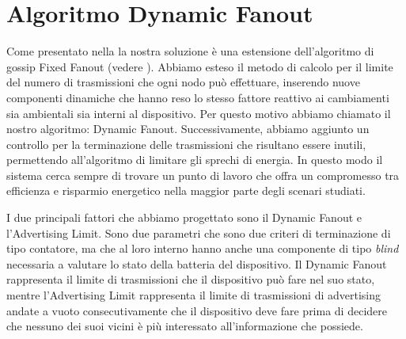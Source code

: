\section{Algoritmo Dynamic Fanout}
\label{sec:alg_df}
Come presentato nella  la nostra soluzione è una estensione dell'algoritmo di gossip Fixed Fanout (vedere ). Abbiamo esteso il metodo di calcolo per il limite del numero di trasmissioni che ogni nodo può effettuare, inserendo nuove componenti dinamiche che hanno reso lo stesso fattore reattivo ai cambiamenti sia ambientali sia interni al dispositivo. Per questo motivo abbiamo chiamato il nostro algoritmo: Dynamic Fanout. Successivamente, abbiamo aggiunto un controllo per la terminazione delle trasmissioni che risultano essere inutili, permettendo all'algoritmo di limitare gli sprechi di energia. In questo modo il sistema cerca sempre di trovare un punto di lavoro che offra un compromesso tra efficienza e risparmio energetico nella maggior parte degli scenari studiati.

I due principali fattori che abbiamo progettato sono il Dynamic Fanout e l'Advertising Limit. Sono due parametri che sono due criteri di terminazione di tipo contatore, ma che al loro interno hanno anche una componente di tipo \textit{blind} necessaria a valutare lo stato della batteria del dispositivo. Il Dynamic Fanout rappresenta il limite di trasmissioni che il dispositivo può fare nel suo stato, mentre l'Advertising Limit rappresenta il limite di trasmissioni di advertising andate a vuoto consecutivamente che il dispositivo deve fare prima di decidere che nessuno dei suoi vicini è più interessato all'informazione che possiede.

